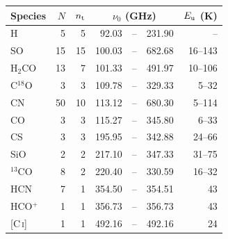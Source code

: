 \begin{tabular}{@{}lrrr@{\,}c@{\,}rr@{}}
\hline
Species & $N$ & $n_{\rm t}$ & \multicolumn{3}{c}{$\nu_0$ (GHz)} & $E_{\rm u}$ (K) \\
\hline
H & 5 & 5 & 92.03 & -- & 231.90 & -- \\
SO & 15 & 15 & 100.03 & -- & 682.68 & 16--143 \\
H$_2$CO & 13 & 7 & 101.33 & -- & 491.97 & 10--106 \\
C$^{18}$O & 3 & 3 & 109.78 & -- & 329.33 & 5--32 \\
CN & 50 & 10 & 113.12 & -- & 680.30 & 5--114 \\
CO & 3 & 3 & 115.27 & -- & 345.80 & 6--33 \\
CS & 3 & 3 & 195.95 & -- & 342.88 & 24--66 \\
SiO & 2 & 2 & 217.10 & -- & 347.33 & 31--75 \\
$^{13}$CO & 8 & 2 & 220.40 & -- & 330.59 & 16--32 \\
HCN & 7 & 1 & 354.50 & -- & 354.51 & 43 \\
HCO$^{+}$ & 1 & 1 & 356.73 & -- & 356.73 & 43 \\
{[C\,\textsc{i}]} & 1 & 1 & 492.16 & -- & 492.16 & 24 \\
\hline
\end{tabular}%
